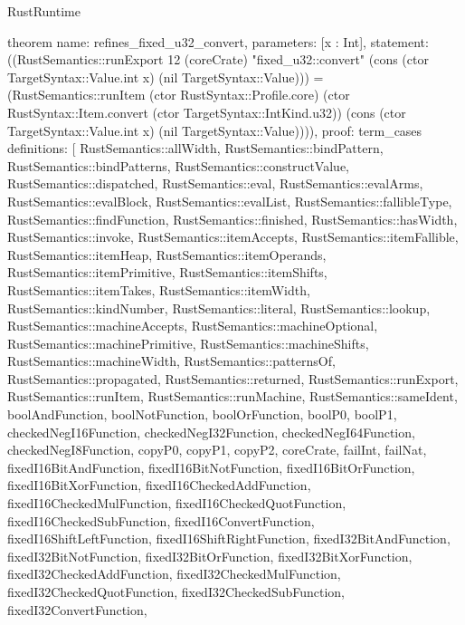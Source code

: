 \begin{lexlean}{RustRuntime}
\begin{semanticmodule}
theorem{
  name: refines_fixed_u32_convert,
  parameters: [x : Int],
  statement: ((RustSemantics::runExport 12 (coreCrate) "fixed_u32::convert" (cons (ctor TargetSyntax::Value.int x) (nil TargetSyntax::Value))) = (RustSemantics::runItem (ctor RustSyntax::Profile.core) (ctor RustSyntax::Item.convert (ctor TargetSyntax::IntKind.u32)) (cons (ctor TargetSyntax::Value.int x) (nil TargetSyntax::Value)))),
  proof: term_cases{
    definitions: [
      RustSemantics::allWidth,
      RustSemantics::bindPattern,
      RustSemantics::bindPatterns,
      RustSemantics::constructValue,
      RustSemantics::dispatched,
      RustSemantics::eval,
      RustSemantics::evalArms,
      RustSemantics::evalBlock,
      RustSemantics::evalList,
      RustSemantics::fallibleType,
      RustSemantics::findFunction,
      RustSemantics::finished,
      RustSemantics::hasWidth,
      RustSemantics::invoke,
      RustSemantics::itemAccepts,
      RustSemantics::itemFallible,
      RustSemantics::itemHeap,
      RustSemantics::itemOperands,
      RustSemantics::itemPrimitive,
      RustSemantics::itemShifts,
      RustSemantics::itemTakes,
      RustSemantics::itemWidth,
      RustSemantics::kindNumber,
      RustSemantics::literal,
      RustSemantics::lookup,
      RustSemantics::machineAccepts,
      RustSemantics::machineOptional,
      RustSemantics::machinePrimitive,
      RustSemantics::machineShifts,
      RustSemantics::machineWidth,
      RustSemantics::patternsOf,
      RustSemantics::propagated,
      RustSemantics::returned,
      RustSemantics::runExport,
      RustSemantics::runItem,
      RustSemantics::runMachine,
      RustSemantics::sameIdent,
      boolAndFunction,
      boolNotFunction,
      boolOrFunction,
      boolP0,
      boolP1,
      checkedNegI16Function,
      checkedNegI32Function,
      checkedNegI64Function,
      checkedNegI8Function,
      copyP0,
      copyP1,
      copyP2,
      coreCrate,
      failInt,
      failNat,
      fixedI16BitAndFunction,
      fixedI16BitNotFunction,
      fixedI16BitOrFunction,
      fixedI16BitXorFunction,
      fixedI16CheckedAddFunction,
      fixedI16CheckedMulFunction,
      fixedI16CheckedQuotFunction,
      fixedI16CheckedSubFunction,
      fixedI16ConvertFunction,
      fixedI16ShiftLeftFunction,
      fixedI16ShiftRightFunction,
      fixedI32BitAndFunction,
      fixedI32BitNotFunction,
      fixedI32BitOrFunction,
      fixedI32BitXorFunction,
      fixedI32CheckedAddFunction,
      fixedI32CheckedMulFunction,
      fixedI32CheckedQuotFunction,
      fixedI32CheckedSubFunction,
      fixedI32ConvertFunction,
}}
\end{semanticmodule}
\end{lexlean}
